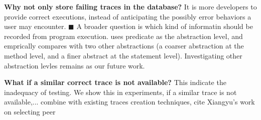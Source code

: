 \vspace{1mm}
\noindent \textbf{Why not only store failing traces in the database?}
It is more developers to provide correct executions, instead of
anticipating the possibly error behaviors a user may encounter. $\blacksquare$
A broader question is which kind of informatin should be recorded
from program execution. \ourtool uses predicate as the abstraction level,
and emprically compares with two other abstractions (a coarser abstraction
at the method level, and a finer abstract at the statement level). Investigating
other abstraction levles remains as our future work.

\vspace{1mm}
\noindent \textbf{What if a similar correct trace is not available?}
This indicate the inadequacy of testing. We show this in experiments, if a
similar trace is not available,... combine with existing
traces creation techniques, cite Xiangyu's work on selecting peer



